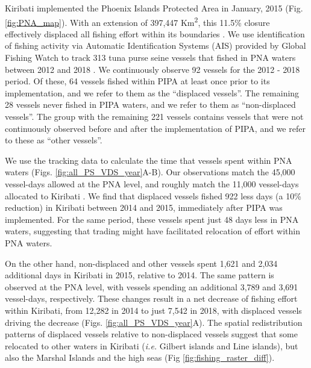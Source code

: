 \documentclass[12pt]{article}
\begin{document}
Kiribati implemented the Phoenix Islands Protected Area in January, 2015 (Fig. \ref{fig:PNA_map}). With an extension of 397,447 Km\textsuperscript{2}, this 11.5\% closure effectively displaced all fishing effort within its boundaries \cite{mccauley_2016,mcdermott_2018}. We use identification of fishing activity via Automatic Identification Systems (AIS) provided by Global Fishing Watch to track 313 tuna purse seine vessels that fished in PNA waters between 2012 and 2018 \cite{kroodsma_2018}. We continuously observe 92 vessels for the 2012 - 2018 period. Of these, 64 vessels fished within PIPA at least once prior to its implementation, and we refer to them as the ``displaced vessels''. The remaining 28 vessels never fished in PIPA waters, and we refer to them as ``non-displaced vessels''. The group with the remaining 221 vessels contains vessels that were not continuously observed before and after the implementation of PIPA, and we refer to these as ``other vessels''.

We use the tracking data to calculate the time that vessels spent within PNA waters (Figs. \ref{fig:all_PS_VDS_year}A-B). Our observations match the 45,000 vessel-days allowed at the PNA level, and roughly match the 11,000 vessel-days allocated to Kiribati \cite{yeeting2018stabilising}. We find that displaced vessels fished 922 less days (a 10\% reduction) in Kiribati between 2014 and 2015, immediately after PIPA was implemented. For the same period, these vessels spent just 48 days less in PNA waters, suggesting that trading might have facilitated relocation of effort within PNA waters.

On the other hand, non-displaced and other vessels spent 1,621 and 2,034 additional days in Kiribati in 2015, relative to 2014. The same pattern is observed at the PNA level, with vessels spending an additional 3,789 and 3,691 vessel-days, respectively. These changes result in a net decrease of fishing effort within Kiribati, from 12,282 in 2014 to just 7,542 in 2018, with displaced vessels driving the decrease (Figs. \ref{fig:all_PS_VDS_year}A). The spatial redistribution patterns of displaced vessels relative to non-displaced vessels suggest that some relocated to other waters in Kiribati (\emph{i.e.} Gilbert islands and Line islands), but also the Marshal Islands and the high seas (Fig \ref{fig:fishing_raster_diff}).
\end{document}
